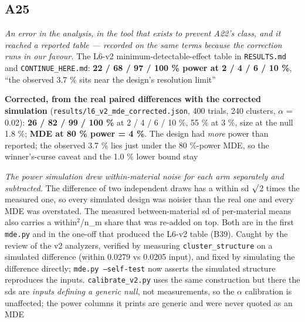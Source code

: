\documentclass[10pt]{article}
\begin{document}
\subsection*{A25}\label{led:A25}
\begin{description}[leftmargin=0pt,itemsep=1pt]
\item[Claim withdrawn.] \emph{An error in the analysis, in the tool that exists to prevent A22's class, and it reached a reported table --- recorded on the same terms because the correction runs in our favour.} The L6-v2 minimum-detectable-effect table in \texttt{RESULTS.md} and \texttt{CONTINUE\_HERE.md}: \textbf{22 / 68 / 97 / 100 \% power at 2 / 4 / 6 / 10 \%}, ``the observed 3.7 \% sits near the design's resolution limit''
\item[Replaced with.] \textbf{Corrected, from the real paired differences with the corrected simulation} (\texttt{results/l6\_v2\_mde\_corrected.json}, 400 trials, 240 clusters, $\alpha$ = 0.02): \textbf{26 / 82 / 99 / 100 \%} at 2 / 4 / 6 / 10 \%, 55 \% at 3 \%, size at the null 1.8 \%; \textbf{MDE at 80 \% power = 4 \%}. The design had \emph{more} power than reported; the observed 3.7 \% lies just under the 80 \%-power MDE, so the winner's-curse caveat and the 1.0 \% lower bound stay
\item[Why it was wrong.] \emph{The power simulation drew within-material noise for each arm separately and subtracted.} The difference of two independent draws has a within sd $\surd$2 times the measured one, so every simulated design was noisier than the real one and every MDE was overstated. The measured between-material sd of per-material means also carries a within$^2$/n\_m share that was re-added on top. Both are in the first \texttt{mde.py} and in the one-off that produced the L6-v2 table (B39). Caught by the review of the v2 analyzers, verified by measuring \texttt{cluster\_structure} on a simulated difference (within 0.0279 vs 0.0205 input), and fixed by simulating the difference directly; \texttt{mde.py --self-test} now asserts the simulated structure reproduces the inputs. \texttt{calibrate\_v2.py} uses the same construction but there the sds are \emph{inputs defining a generic null}, not measurements, so the $\alpha$ calibration is unaffected; the power columns it prints are generic and were never quoted as an MDE
\end{description}
\end{document}
